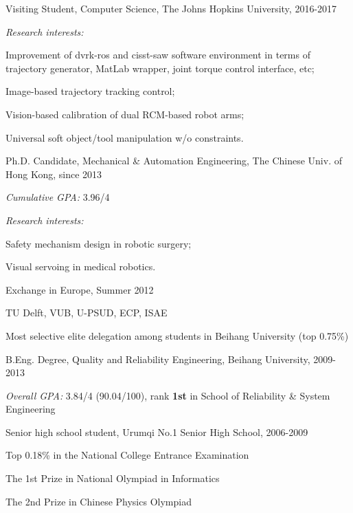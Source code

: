 \documentclass[10pt,letterpaper]{article}
\renewenvironment{itemize}{
  \begin{list}{}{
    \setlength{\leftmargin}{1.5em}
    \setlength{\itemsep}{0.25em}
    \setlength{\parskip}{0pt}
    \setlength{\parsep}{0.25em}
  }
}{
  \end{list}
}
\begin{document}
\begin{itemize}
  \item Visiting Student, Computer Science, The Johns Hopkins University, 2016-2017
    \begin{itemize}
    \item \emph{Research interests:}
      \begin{itemize}
      \item Improvement of dvrk-ros and cisst-saw software environment in terms of trajectory generator, MatLab wrapper, joint torque control interface, etc;
      \item Image-based trajectory tracking control;
      \item Vision-based calibration of dual RCM-based robot arms;
      \item Universal soft object/tool manipulation w/o constraints.
      \end{itemize}
    \end{itemize}
  \item Ph.D. Candidate, Mechanical \& Automation Engineering, The Chinese Univ. of Hong Kong, since 2013
    \begin{itemize}
    \item \emph{Cumulative GPA:} 3.96/4
    \item \emph{Research interests:}
      \begin{itemize}
      \item Safety mechanism design in robotic surgery;
      \item Visual servoing in medical robotics.
      \end{itemize}
    \end{itemize}
  \item Exchange in Europe, Summer 2012
    \begin{itemize}
    \item TU Delft, VUB, U-PSUD, ECP, ISAE
    \item Most selective elite delegation among students in Beihang University (top 0.75\%)
    \end{itemize}
  \item B.Eng. Degree, Quality and Reliability Engineering, Beihang University, 2009-2013
    \begin{itemize}
    \item \emph{Overall GPA:} 3.84/4 (90.04/100), rank \textbf{1st} in School of Reliability \& System Engineering
    \end{itemize}
  \item Senior high school student, Urumqi No.1 Senior High School, 2006-2009
    \begin{itemize}
    \item Top 0.18\% in the National College Entrance Examination
    \item The 1st Prize in National Olympiad in Informatics
    \item The 2nd Prize in Chinese Physics Olympiad
    \end{itemize}
\end{itemize}
\end{document}

